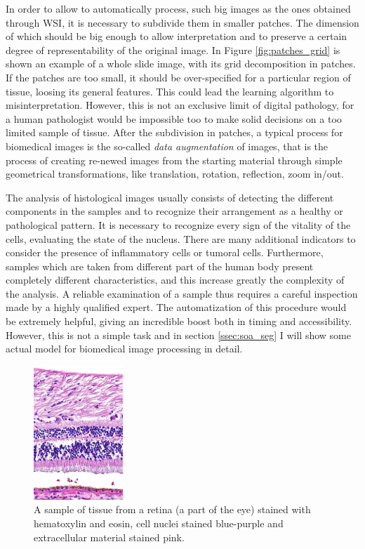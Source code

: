    In order to allow to automatically process, such big images as the ones obtained through WSI, it is necessary to subdivide them in smaller patches. The dimension of which should be big enough to allow interpretation and to preserve a certain degree of representability of the original image. In Figure \ref{fig:patches_grid} is shown an example of a whole slide image, with its grid decomposition in patches. If the patches are too small, it should be over-specified for a particular region of tissue, loosing its general features. This could lead the learning algorithm to misinterpretation. However, this is not an exclusive limit of digital pathology, for a human pathologist would be impossible too to make solid decisions on a too limited sample of tissue. After the subdivision in patches, a typical process for biomedical images is the so-called \textit{data augmentation} of images, that is the process of creating re-newed images from the starting material through simple geometrical transformations, like translation, rotation, reflection, zoom in/out.

    The analysis of histological images usually consists of detecting the different components in the samples and to recognize their arrangement as a healthy or pathological pattern. It is necessary to recognize every sign of the vitality of the cells, evaluating the state of the nucleus. There are many additional indicators to consider the presence of inflammatory cells or tumoral cells. Furthermore, samples which are taken from different part of the human body present completely different characteristics, and this increase greatly the complexity of the analysis.
    A reliable examination of a sample thus requires a careful inspection made by a highly qualified expert. The automatization of this procedure would be extremely helpful, giving an incredible boost both in timing and accessibility. However, this is not a simple task and in section \ref{ssec:soa_seg} I will show some actual model for biomedical image processing in detail.

     \begin{figure}
         \centering
         \includegraphics[width = 0.3\textwidth]{images/h&e_retyna}
         \caption{A sample of tissue from a retina (a part of the eye) stained with hematoxylin and eosin, cell nuclei stained blue-purple and extracellular material stained pink.}
         \label{fig:he_retyna}
     \end{figure}

